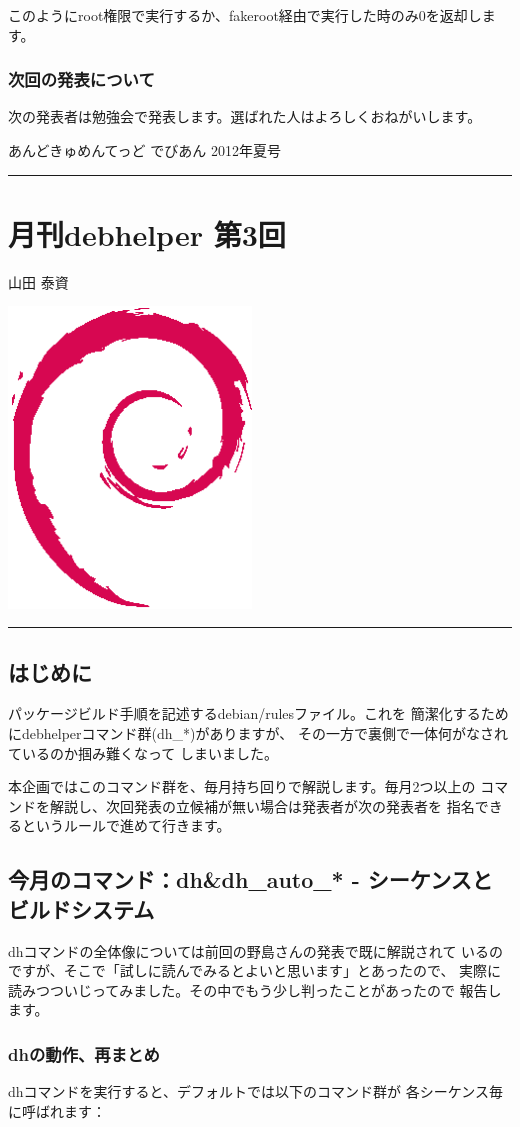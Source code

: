 \documentclass[mingoth,a4paper]{jsarticle}
\renewcommand{\dancersection}[2]{%
\newpage
あんどきゅめんてっど でびあん 2012年夏号
%
\vspace{0.1mm}\\
{\color{dancerdarkblue}\rule{\hsize}{2mm}}

%
%
\begin{minipage}[t]{0.6\hsize}
\color{dancerdarkblue}
\vspace{1cm}
\section{#1}
\hfill{}#2\\
\end{minipage}
\begin{minipage}[t]{0.4\hsize}
\vspace{-2cm}
\hfill{}\includegraphics[height=8cm]{image200502/openlogo-nd.eps}\\
\vspace{-5cm}
\end{minipage}
%
{\color{dancerlightblue}\rule{0.66\hsize}{2mm}}
%
\vspace{2cm}
}
\begin{document}
このようにroot権限で実行するか、fakeroot経由で実行した時のみ0を返却します。

\subsubsection{次回の発表について}

次の発表者は勉強会で発表します。選ばれた人はよろしくおねがいします。

\clearpage

\dancersection{月刊debhelper 第3回}{山田 泰資}

\subsection{はじめに}
パッケージビルド手順を記述するdebian/rulesファイル。これを
簡潔化するためにdebhelperコマンド群(dh\_*)がありますが、
その一方で裏側で一体何がなされているのか掴み難くなって
しまいました。

本企画ではこのコマンド群を、毎月持ち回りで解説します。毎月2つ以上の
コマンドを解説し、次回発表の立候補が無い場合は発表者が次の発表者を
指名できるというルールで進めて行きます。

\subsection{今月のコマンド：dh\&dh\_auto\_* - シーケンスとビルドシステム}

dhコマンドの全体像については前回の野島さんの発表で既に解説されて
いるのですが、そこで「試しに読んでみるとよいと思います」とあったので、
実際に読みつついじってみました。その中でもう少し判ったことがあったので
報告します。

\subsubsection{dhの動作、再まとめ}

dhコマンドを実行すると、デフォルトでは以下のコマンド群が
各シーケンス毎に呼ばれます：
\end{document}

